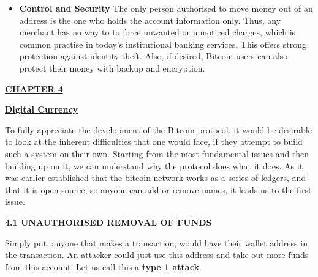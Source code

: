 \documentclass[12pt,a4paper]{report}
\begin{document}
\begin{justify}
\begin{itemize}
  \vspace{10mm}
  
  \item \textbf{Control and Security} \newline 
  The only person authorised to move money out of an address is the one who holds the account information only. Thus, any merchant has no way to to force unwanted or unnoticed charges, which is common practise in today's institutional banking services. This offers strong protection against identity theft. Also, if desired, Bitcoin users can also protect their money with backup and encryption.
  

\end{itemize}


\newpage

\begin{center}\underline{  \Large\textbf{CHAPTER 4}}\end{center}
\begin{center}\underline{ \Large \textbf{Digital Currency}}\end{center}

\vspace{10mm}

To fully appreciate the development of the Bitcoin protocol, it would be desirable to look at the inherent difficulties that one would face, if they attempt to build such a system on their own. Starting from the most fundamental issues and then building up on it, we can understand why the protocol does what it does.
As it was earlier established that the bitcoin network works as a series of ledgers, and that it is open source, so anyone can add or remove names, it leads us to the first issue.
\vspace{10mm}

\textbf{4.1 UNAUTHORISED REMOVAL OF FUNDS}
\vspace{10mm}

Simply put, anyone that makes a transaction, would have their wallet address in the transaction. An attacker could just use this address and take out more funds from this account. Let us call this a \textbf{type 1 attack}. \newline


\end{justify}
\end{document}
